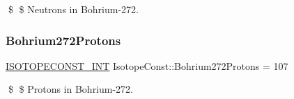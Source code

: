\$ \$ Neutrons in Bohrium-\/272. \mbox{\label{group___isotope_const-_bohrium-_bh272_ga94157df4708e79133bea444d25d1b411}} 
\subsubsection{\texorpdfstring{Bohrium272\+Protons}{Bohrium272Protons}}
{\footnotesize\ttfamily \mbox{\hyperlink{group___isotope_const-_macros_ga5f18360b3e99483a35c32d789e62621c}{I\+S\+O\+T\+O\+P\+E\+C\+O\+N\+S\+T\+\_\+\+I\+NT}} Isotope\+Const\+::\+Bohrium272\+Protons = 107}

\$ \$ Protons in Bohrium-\/272. 